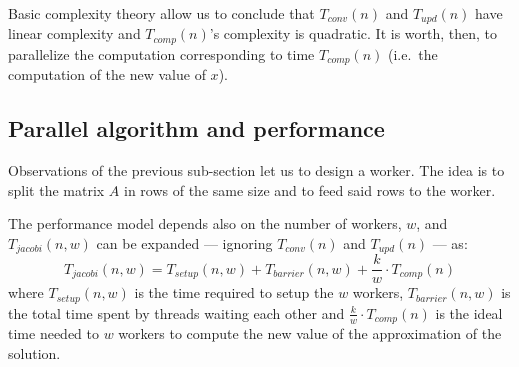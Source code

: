 Basic complexity theory allow us to conclude that $T_{conv}(n)$ and $T_{upd}(n)$ have linear complexity and $T_{comp}(n)$'s complexity is quadratic.
It is worth, then, to parallelize the computation corresponding to time $T_{comp}(n)$ (i.e.\ the computation of the new value of $x$).

\subsection{Parallel algorithm and performance}\label{subsec:par}
Observations of the previous sub-section let us to design a worker.
The idea is to split the matrix $A$ in rows of the same size and to feed said rows to the worker.

The performance model depends also on the number of workers, $w$, and $ T_{jacobi}(n, w)$ can be expanded --- ignoring $T_{conv}(n)$ and $T_{upd}(n)$ --- as:
\[
	 T_{jacobi}(n, w) = T_{setup} (n, w) + T_{barrier} (n, w) + \frac{k}{w} \cdot T_{comp}(n)
\]
where $T_{setup} (n, w)$ is the time required to setup the $w$ workers, $T_{barrier} (n, w)$ is the total time spent by threads waiting each other and $\frac{k}{w} \cdot T_{comp}(n)$ is the ideal time needed to $w$ workers to compute the new value of the approximation of the solution.